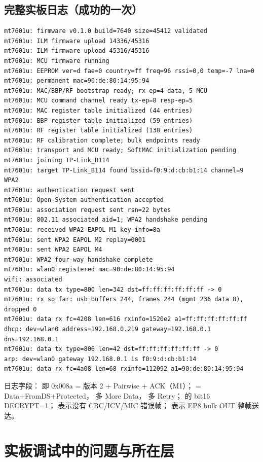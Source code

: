 \subsection{完整实板日志（成功的一次）}
\begin{lstlisting}[basicstyle=\ttfamily\small\color{tinygreen!70!black},backgroundcolor=\color{tinygreen!4}]
mt7601u: firmware v0.1.0 build=7640 size=45412 validated
mt7601u: ILM firmware upload 14336/45316
mt7601u: ILM firmware upload 45316/45316
mt7601u: MCU firmware running
mt7601u: EEPROM ver=d fae=0 country=ff freq=96 rssi=0,0 temp=-7 lna=0
mt7601u: permanent mac=90:de:80:14:95:94
mt7601u: MAC/BBP/RF bootstrap ready; rx-ep=4 data, 5 MCU
mt7601u: MCU command channel ready tx-ep=8 resp-ep=5
mt7601u: MAC register table initialized (44 entries)
mt7601u: BBP register table initialized (59 entries)
mt7601u: RF register table initialized (138 entries)
mt7601u: RF calibration complete; bulk endpoints ready
mt7601u: transport and MCU ready; SoftMAC initialization pending
mt7601u: joining TP-Link_B114
mt7601u: target TP-Link_B114 found bssid=f0:9:d:cb:b1:14 channel=9 WPA2
mt7601u: authentication request sent
mt7601u: Open-System authentication accepted
mt7601u: association request sent rsn=22 bytes
mt7601u: 802.11 associated aid=1; WPA2 handshake pending
mt7601u: received WPA2 EAPOL M1 key-info=8a
mt7601u: sent WPA2 EAPOL M2 replay=0001
mt7601u: sent WPA2 EAPOL M4
mt7601u: WPA2 four-way handshake complete
mt7601u: wlan0 registered mac=90:de:80:14:95:94
wifi: associated
mt7601u: data tx type=800 len=342 dst=ff:ff:ff:ff:ff:ff -> 0
mt7601u: rx so far: usb buffers 244, frames 244 (mgmt 236 data 8), dropped 0
mt7601u: data rx fc=4208 len=616 rxinfo=1520e2 a1=ff:ff:ff:ff:ff:ff
dhcp: dev=wlan0 address=192.168.0.219 gateway=192.168.0.1 dns=192.168.0.1
mt7601u: data tx type=806 len=42 dst=ff:ff:ff:ff:ff:ff -> 0
arp: dev=wlan0 gateway 192.168.0.1 is f0:9:d:cb:b1:14
mt7601u: data rx fc=4a08 len=68 rxinfo=112092 a1=90:de:80:14:95:94
\end{lstlisting}

日志字段： 即 0x008a = 版本 2 + Pairwise + ACK（M1）； = Data+FromDS+Protected，
 多 More Data， 多 Retry； 的 bit16 DECRYPT=1；
 表示没有 CRC/ICV/MIC 错误帧； 表示 EP8 bulk OUT 整帧送达。

\section{实板调试中的问题与所在层}\label{wa:bugs}

